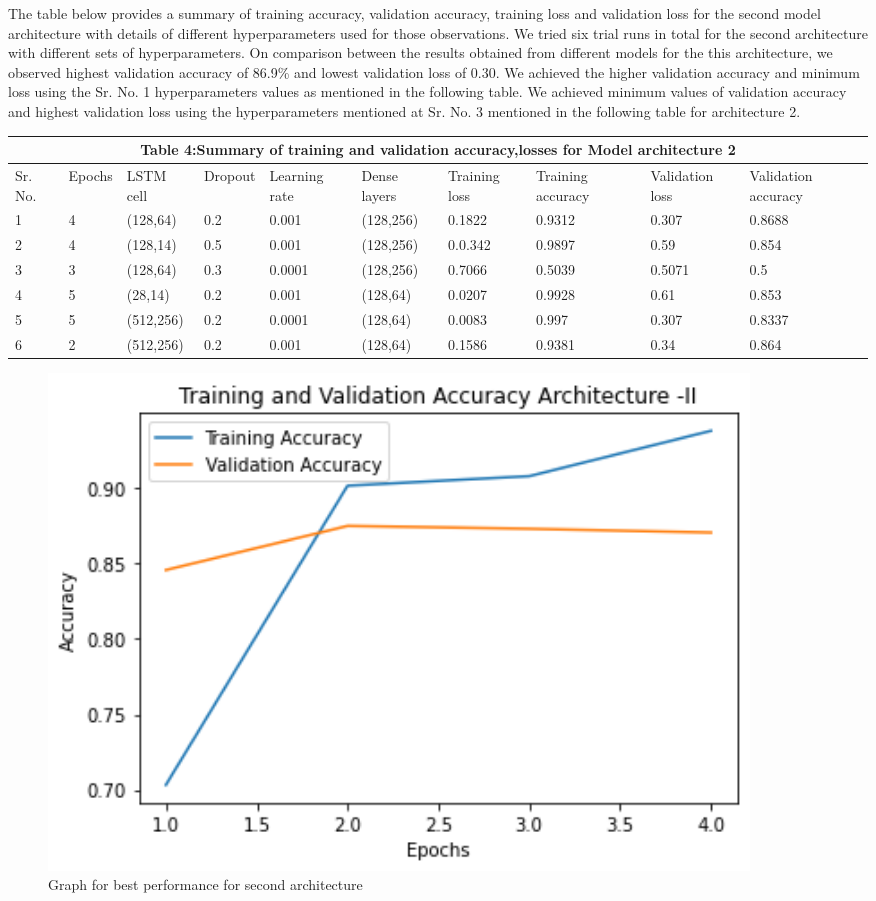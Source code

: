 \documentclass{article}
\begin{document}
The table below provides a summary  of  training accuracy, validation accuracy, training loss and validation loss for the second model architecture with details of different hyperparameters used for those observations. We tried six trial runs in total for the second architecture with different sets of hyperparameters. On comparison between the results obtained from different models for the this architecture, we observed highest validation accuracy of 86.9\% and lowest validation loss of 0.30. We achieved the higher validation accuracy and minimum loss using the Sr. No. 1  hyperparameters values as mentioned in the following table. We achieved minimum values of validation accuracy and highest validation loss using the hyperparameters mentioned at Sr. No. 3 mentioned in the following table for architecture 2.\newline
\newline
\begin{tabular}[H]{ |p{0.4cm}|p{1cm}|p{1.3cm}|p{1.15cm}|p{1.25cm}|p{1.25cm}|p{1.3cm}|p{1.34cm}|p{1.45cm}|p{1.45cm}|}
\hline
 \multicolumn{10}{|c|}{Table 4:Summary of training and validation accuracy,losses for Model architecture 2} \\
 \hline
 Sr. No. & Epochs & LSTM cell & Dropout & Learning rate & Dense layers & Training loss & Training accuracy & Validation loss & Validation accuracy\\
 \hline
 1 & 4 & (128,64) & 0.2 & 0.001 & (128,256) & 0.1822 & 0.9312 & 0.307 & 0.8688 \\ 
 2 & 4 & (128,14) & 0.5 & 0.001 & (128,256) & 0.0.342 & 0.9897 & 0.59 & 0.854 \\
 3 & 3 & (128,64) & 0.3 & 0.0001 & (128,256) & 0.7066 & 0.5039 & 0.5071 & 0.5 \\
 4 & 5 & (28,14) & 0.2 & 0.001 & (128,64) & 0.0207 & 0.9928 & 0.61 & 0.853 \\
 5 & 5 & (512,256) & 0.2 & 0.0001 & (128,64) & 0.0083 & 0.997 & 0.307 & 0.8337 \\
 6 & 2 & (512,256) & 0.2 & 0.001 & (128,64) & 0.1586 & 0.9381 & 0.34 & 0.864 \\
 \hline
\end{tabular}


\begin{figure}[H]
    \centering
    \includegraphics[width=0.9\textwidth]{MicrosoftTeams-image.png}
    \caption{Graph for best performance for second architecture}
    \label{fig:LossArch2}
\end{figure}
\end{document}
